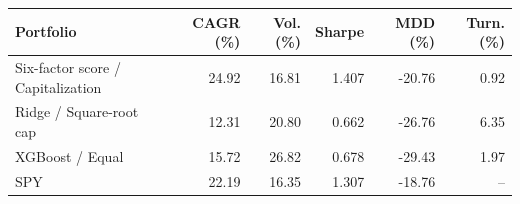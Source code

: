 \begin{tabular}{lrrrrr}
\toprule
Portfolio & CAGR (\%) & Vol. (\%) & Sharpe & MDD (\%) & Turn. (\%) \\
\midrule
Six-factor score / Capitalization & 24.92 & 16.81 & 1.407 & -20.76 & 0.92 \\
Ridge / Square-root cap & 12.31 & 20.80 & 0.662 & -26.76 & 6.35 \\
XGBoost / Equal & 15.72 & 26.82 & 0.678 & -29.43 & 1.97 \\
SPY & 22.19 & 16.35 & 1.307 & -18.76 & -- \\
\bottomrule
\end{tabular}
